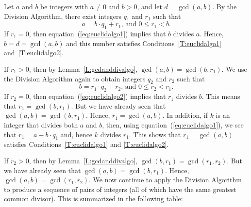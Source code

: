 \begin{myproof}
Let  $a$  and  $b$  be integers with $a \ne 0$ and  $b > 0$, and let  
$d = \gcd( {a, b} )$.  By the Division Algorithm, there exist integers  $q_1 $ and  $r_1 $  such that
\begin{equation} \label{eq:euclidalgo1}
a = b \cdot q_1  + r_1 \text{,  and  }0 \leq r_1  < b.
\end{equation}
If  $r_1  = 0$, then equation~(\ref{eq:euclidalgo1}) implies that  $b$  divides  $a$.  Hence,  $b = d = \gcd( {a, b} )$ and  this number satisfies  Conditions~\ref{T:euclidalgo1} and~\ref{T:euclidalgo2}.

If  $r_1  > 0$, then by Lemma~\ref{L:gcdanddivalgo},  
$\gcd( {a, b} ) = \gcd( {b, r_1 } )$.  We use the Division Algorithm again to obtain integers  $q_2 $  and  $r_2 $  such that
\begin{equation} \label{eq:euclidalgo2}
b = r_1  \cdot q_2  + r_2 \text{,  and  }0 \leq r_2  < r_1.
\end{equation}
If  $r_2  = 0$, then equation~(\ref{eq:euclidalgo2}) implies that  $r_1 $ divides  $b$.  This means that  $r_1  = \gcd( {b, r_1 } )$.  But we have already seen that  
$\gcd( {a, b} ) = \gcd( {b, r_1 } )$.  Hence, 
$r_1  = \gcd( {a, b} )$.  In addition, if  $k$  is an integer that divides both  $a$  and  $b$, then, using equation~(\ref{eq:euclidalgo1}), we see that  $r_1  = a - b \cdot q_1 $ and, hence  $k$  divides  $r_1 $.  This shows that  $r_1  = \gcd( {a, b} )$  satisfies Conditions~\ref{T:euclidalgo1} and \ref{T:euclidalgo2}.

If  $r_2  > 0$, then by Lemma~\ref{L:gcdanddivalgo},  
$\gcd( {b, r_1 } ) = \gcd( {r_1 , r_2 } )$.  But we have already seen that  $\gcd( {a, b} ) = \gcd( {b, r_1 } )$.  Hence, 
$\gcd( {a, b} ) = \gcd( {r_1 , r_2 } )$.  We now continue to apply the Division Algorithm to produce a sequence of pairs of  integers (all of which have the same greatest common divisor).  This is summarized in the following table:


\end{myproof}
